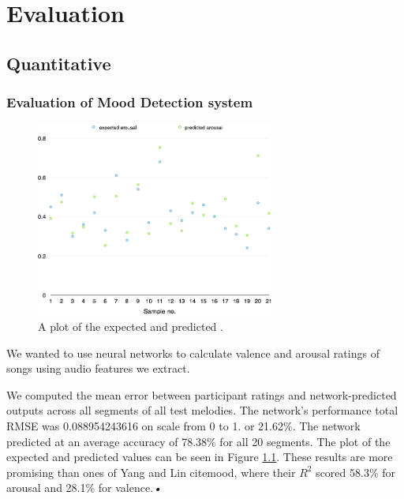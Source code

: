 
\chapter{Evaluation} %

\label{Chapter6} %




\section{Quantitative}
\vspace{10pt}

\subsection{Evaluation of Mood Detection system}

\begin{figure}[t]
    \includegraphics[width=0.7\textwidth]{Figures/finalarousal}
    \centering

  \caption{A plot of the expected and predicted .}
  \label{fig:anneval}
\end{figure}


We wanted to use neural networks to calculate valence and arousal ratings of songs using audio features we extract. 

We computed the mean error between participant ratings and network-predicted outputs across all segments of all test melodies. The network's performance total RMSE was 0.088954243616 on scale from 0 to 1. or 21.62\%.
The network predicted at an average accuracy of 78.38\% for all 20 segments. The plot of the expected and predicted values can be seen in Figure \ref{fig:anneval}.
These results are more promising than ones of Yang and Lin cite{mood}, where their $R^2$ scored 58.3\% for arousal and 28.1\% for valence.\textit{•}


